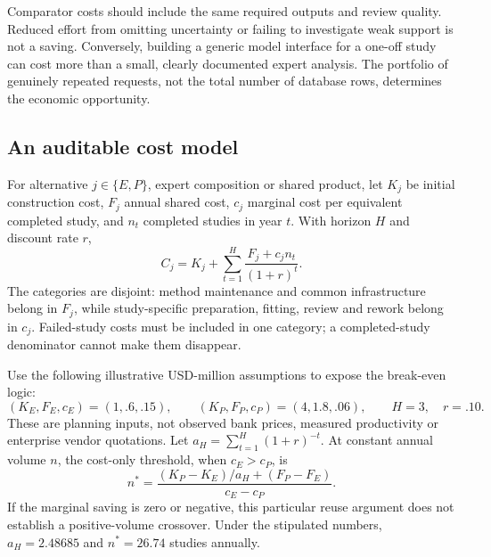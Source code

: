 Comparator costs should include the same required outputs and review
quality. Reduced effort from omitting uncertainty or failing to investigate
weak support is not a saving. Conversely, building a generic model interface
for a one-off study can cost more than a small, clearly documented expert
analysis. The portfolio of genuinely repeated requests, not the total
number of database rows, determines the economic opportunity.

\subsection{An auditable cost model}
\label{r3:cost-model}

For alternative $j\in\{E,P\}$, expert composition or shared product,
let $K_j$ be initial construction cost, $F_j$ annual shared cost,
$c_j$ marginal cost per equivalent completed study, and $n_t$ completed
studies in year $t$. With horizon $H$ and discount rate $r$,
\begin{equation}
 C_j=K_j+\sum_{t=1}^{H}\frac{F_j+c_jn_t}{(1+r)^t}.
 \label{r3:present-cost}
\end{equation}
The categories are disjoint: method maintenance and common infrastructure
belong in $F_j$, while study-specific preparation, fitting, review and
rework belong in $c_j$. Failed-study costs must be included in one
category; a completed-study denominator cannot make them disappear.

Use the following illustrative USD-million assumptions to expose the
break-even logic:
\[
 (K_E,F_E,c_E)=(1,.6,.15),\qquad
 (K_P,F_P,c_P)=(4,1.8,.06),\qquad H=3,\quad r=.10.
\]
These are planning inputs, not observed bank prices, measured productivity
or enterprise vendor quotations. Let
$a_H=\sum_{t=1}^H(1+r)^{-t}$. At constant annual volume $n$, the cost-only
threshold, when $c_E>c_P$, is
\begin{equation}
 n^*=\frac{(K_P-K_E)/a_H+(F_P-F_E)}{c_E-c_P}.
 \label{r3:reuse-threshold}
\end{equation}
If the marginal saving is zero or negative, this particular reuse argument
does not establish a positive-volume crossover. Under the stipulated
numbers, $a_H=2.48685$ and $n^*=26.74$ studies annually.

